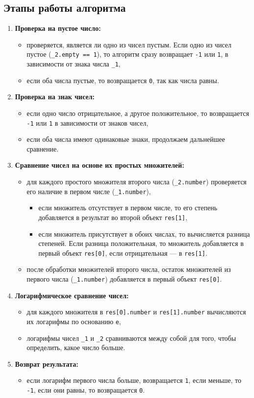 \subsection*{Этапы работы алгоритма}
\begin{enumerate}
	\item \textbf{Проверка на пустое число:}
	\begin{itemize}
		\item проверяется, является ли одно из чисел пустым. Если одно из чисел пустое (\texttt{\_2.empty == 1}), то алгоритм сразу возвращает \texttt{-1} или \texttt{1}, в зависимости от знака числа \texttt{\_1},
		\item если оба числа пустые, то возвращается \texttt{0}, так как числа равны.
	\end{itemize}
	
	\item \textbf{Проверка на знак чисел:}
	\begin{itemize}
		\item если одно число отрицательное, а другое положительное, то возвращается \texttt{-1} или \texttt{1} в зависимости от знаков чисел,
		\item если оба числа имеют одинаковые знаки, продолжаем дальнейшее сравнение.
	\end{itemize}
	
	\item \textbf{Сравнение чисел на основе их простых множителей:}
	\begin{itemize}
		\item для каждого простого множителя второго числа (\texttt{\_2.number}) проверяется его наличие в первом числе (\texttt{\_1.number}),
		\begin{itemize}
			\item если множитель отсутствует в первом числе, то его степень добавляется в результат во второй объект \texttt{res[1]},
			\item если множитель присутствует в обоих числах, то вычисляется разница степеней. Если разница положительная, то множитель добавляется в первый объект \texttt{res[0]}, если отрицательная — в \texttt{res[1]}.
		\end{itemize}
		\item после обработки множителей второго числа, остаток множителей из первого числа (\texttt{\_1.number}) добавляется в первый объект \texttt{res[0]}.
	\end{itemize}
	
	\item \textbf{Логарифмическое сравнение чисел:}
	\begin{itemize}
		\item для каждого множителя в \texttt{res[0].number} и \texttt{res[1].number} вычисляются их логарифмы по основанию \texttt{e},
		\item логарифмы чисел \texttt{\_1} и \texttt{\_2} сравниваются между собой для того, чтобы определить, какое число больше.
	\end{itemize}
	
	\item \textbf{Возврат результата:}
	\begin{itemize}
		\item если логарифм первого числа больше, возвращается \texttt{1}, если меньше, то \texttt{-1}, если они равны, то возвращается \texttt{0}.
	\end{itemize}
\end{enumerate}
\clearpage
